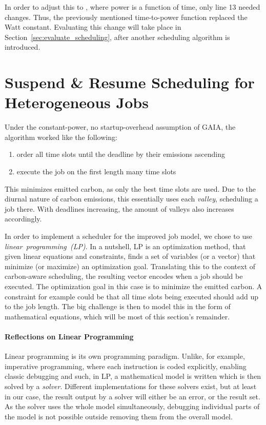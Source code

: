 In order to adjust this to \modelname, where power is a function of time, only line 13 needed changes. 
Thus, the previously mentioned time-to-power function replaced the Watt constant.
Evaluating this change will take place in Section~\ref{sec:evaluate_scheduling}, after another scheduling algorithm is introduced.

\section{{Suspend \& Resume Scheduling for Heterogeneous Jobs}} \label{sec:checkpoint_resume_lp}

Under the constant-power, no startup-overhead assumption of GAIA, the algorithm worked like the following:

\begin{enumerate}
    \item order all time slots until the deadline by their emissions ascending
    \item execute the job on the first length many time slots
\end{enumerate}

This minimizes emitted carbon, as only the best time slots are used.
Due to the diurnal nature of carbon emissions, this essentially uses each \emph{valley}, scheduling a job there. 
With deadlines increasing, the amount of valleys also increases accordingly.

In order to implement a scheduler for the improved job model, we chose to use \emph{linear~programming~(LP)}.
In a nutshell, LP is an optimization method, that given linear equations and constraints, finds a set of variables (or a vector) that minimize (or maximize) an optimization goal.
Translating this to the context of carbon-aware scheduling, the resulting vector encodes when a job should be executed.
The optimization goal in this case is to minimize the emitted carbon. 
A constraint for example could be that all time slots being executed should add up to the job length. 
The big challenge is then to model this in the form of mathematical equations, which will be most of this section's remainder.

\paragraph{Reflections on Linear Programming}

Linear programming is its own programming paradigm. Unlike, for example, imperative programming, where each instruction is coded explicitly, enabling classic debugging and such, in LP, a mathematical model is written which is then solved by a \emph{solver}. 
Different implementations for these solvers exist, but at least in our case, the result output by a solver will either be an error, or the result set. 
As the solver uses the whole model simultaneously, debugging individual parts of the model is not possible outside removing them from the overall model.

